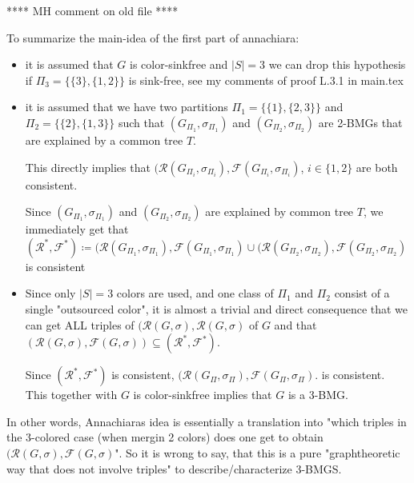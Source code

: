 \documentclass[final,3p,times]{elsarticle}
\newcommand{\TODO}[1]{\begingroup\color{red}#1\endgroup}
\newcommand{\ak}[1]{\begingroup\color{orange}#1\endgroup}
\begin{document}
\TODO{ \begin{center}**** MH comment on old file **** \end{center} 
 To summarize the main-idea of the first part of annachiara: 
 \begin{itemize}[nolistsep, noitemsep]
 	\item it is assumed that $G$ is color-sinkfree and $|S|=3$ \ak{we can drop this hypothesis if $\Pi_3=\{\{3\},\{1,2\}\}$ is sink-free, see my comments of proof L.3.1 in main.tex}
 	\item it is assumed that we have two partitions $\Pi_1 = \{\{1\},\{2,3\}\}$ and $\Pi_2=
		 \{\{2\},\{1,3\}\}$ such that 		 
		 $(G_{\Pi_1},\sigma_{\Pi_1})$ and $(G_{\Pi_2},\sigma_{\Pi_2})$ are 2-BMGs that
		 are explained by a common tree $T$. \smallskip
		 
		 This directly implies that
		 $(\mathscr{R}(G_{\Pi_i},\sigma_{\Pi_i}),\mathscr{F}(G_{\Pi_i},\sigma_{\Pi_i})$,
 		$i\in \{1,2\}$ are both consistent.		 \smallskip
 		
 		Since $(G_{\Pi_1},\sigma_{\Pi_1})$ and $(G_{\Pi_2},\sigma_{\Pi_2})$ are explained by common tree $T$, 
 		we immediately get that 
 		$(\mathscr{R}^*, \mathscr{F}^*) \coloneqq
 		  (\mathscr{R}(G_{\Pi_1},\sigma_{\Pi_1}),\mathscr{F}(G_{\Pi_1},\sigma_{\Pi_1})
 		  \cup (\mathscr{R}(G_{\Pi_2},\sigma_{\Pi_2}),\mathscr{F}(G_{\Pi_2},\sigma_{\Pi_2})$
 		  is consistent	
 	\item Since only $|S|=3$ colors are used, and one class of $\Pi_1$ and
 	      $\Pi_2$ consist of a single "outsourced color", it is almost a trivial
 	      and direct consequence that we can get ALL triples of
 	      $(\mathscr{R}(G,\sigma),\mathscr{R}(G,\sigma)$ of $G$ and that
 	      $(\mathscr{R}(G,\sigma),\mathscr{F}(G,\sigma)) \subseteq
 	      (\mathscr{R}^*, \mathscr{F}^*)$. 
 	      
  	      Since $(\mathscr{R}^*, \mathscr{F}^*)$ is consistent, 
 	      $(\mathscr{R}(G_{\Pi},\sigma_{\Pi}),\mathscr{F}(G_{\Pi},\sigma_{\Pi})$.
 	      is consistent. This together with $G$ is color-sinkfree implies that
 	      $G$ is a 3-BMG.  
  	  
 \end{itemize}
 
 \smallskip
 \noindent
  In other words, Annachiaras idea is essentially  a translation
 into "which triples in the 3-colored case (when mergin 2 colors) 
 does one get to obtain $(\mathscr{R}(G,\sigma),\mathscr{F}(G,\sigma)$". 
 So it is wrong to say, that this is a pure "graphtheoretic way
 that does not involve triples"
 to describe/characterize 3-BMGS. \smallskip
 
}
\end{document}
